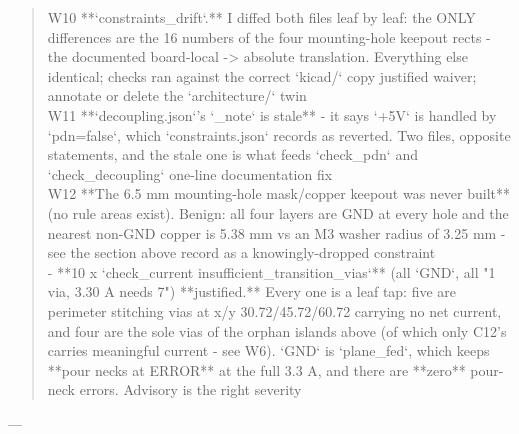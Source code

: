 \documentclass[11pt,a4paper]{article}
\begin{document}
\begin{quote}
\textbar{} W10 \textbar{} {*}{*}`constraints\_drift`.{*}{*} I diffed both files leaf by leaf: the ONLY differences are the 16 numbers of the four mounting-hole keepout rects - the documented board-local -\textgreater{} absolute translation. Everything else identical; checks ran against the correct `kicad/` copy \textbar{} justified waiver; annotate or delete the `architecture/` twin \textbar{}\\
\textbar{} W11 \textbar{} {*}{*}`decoupling.json`'s `\_note` is stale{*}{*} - it says `+5V` is handled by `pdn=false`, which `constraints.json` records as reverted. Two files, opposite statements, and the stale one is what feeds `check\_pdn` and `check\_decoupling` \textbar{} one-line documentation fix \textbar{}\\
\textbar{} W12 \textbar{} {*}{*}The 6.5 mm mounting-hole mask/copper keepout was never built{*}{*} (no rule areas exist). Benign: all four layers are GND at every hole and the nearest non-GND copper is 5.38 mm vs an M3 washer radius of 3.25 mm - see the section above \textbar{} record as a knowingly-dropped constraint \textbar{}\\
\textbar{} - \textbar{} {*}{*}10 x `check\_current insufficient\_transition\_vias`{*}{*} (all `GND`, all "1 via, 3.30 A needs 7") \textbar{} {*}{*}justified.{*}{*} Every one is a leaf tap: five are perimeter stitching vias at x/y 30.72/45.72/60.72 carrying no net current, and four are the sole vias of the orphan islands above (of which only C12's carries meaningful current - see W6). `GND` is `plane\_fed`, which keeps {*}{*}pour necks at ERROR{*}{*} at the full 3.3 A, and there are {*}{*}zero{*}{*} pour-neck errors. Advisory is the right severity \textbar{}
\end{quote}
---
\end{document}
